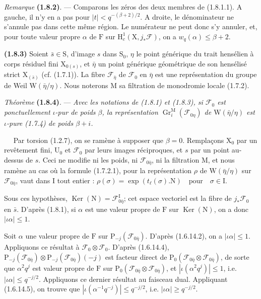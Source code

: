 \documentclass[11pt,leqno]{article}
\newcommand{\Page}[1]{\ifvmode\noindent\else\unskip\ \fi{\footnotesize\textcolor{gray}{[p.\,#1]}}\ \ignorespaces}
\begin{document}
\textit{Remarque} \textbf{(1.8.2)}. — Comparons les zéros des deux membres de (1.8.1.1). A gauche, il n’y en a pas pour \(|t|<q^{-(\beta+2)/2}\). A droite, le dénominateur ne s’annule pas dans cette même région. Le numérateur ne peut donc s’y annuler, et, pour toute valeur propre \(\alpha\) de \(\mathrm{F}\) sur \(\mathrm{H}_c^1(\mathrm{X},j_*\mathscr{F})\), on a \(w_q(\alpha)\leq\beta+2\).

\textbf{(1.8.3)} Soient \(\bar{s}\in\mathrm{S}\), d’image \(s\) dans \(\mathrm{S}_0\), \(\eta\) le point générique du trait hensélien à corps résiduel fini \(\mathrm{X}_{0(s)}\), et \(\bar{\eta}\) un point générique géométrique de son hensélisé strict \(\mathrm{X}_{(\bar{s})}\) (cf. (1.7.1)). La fibre \(\mathscr{F}_{\bar{\eta}}\) de \(\mathscr{F}_0\) en \(\bar{\eta}\) est une représentation du groupe de Weil \(\mathrm{W}(\bar{\eta}/\eta)\). Nous noterons \(\mathrm{M}\) sa filtration de monodromie locale (1.7.2).

\textit{Théorème} \textbf{(1.8.4)}. — \textit{Avec les notations de \textup{(1.8.1)} et \textup{(1.8.3)}, si \(\mathscr{F}_0\) est ponctuellement \(\iota\)-pur de poids \(\beta\), la représentation \(\operatorname{Gr}_i^{\mathrm{M}}(\mathscr{F}_{0\eta})\) de \(\mathrm{W}(\bar{\eta}/\eta)\) est \(\iota\)-pure \textup{(1.7.4)} de poids \(\beta+i\).}

\Page{176}
Par torsion (1.2.7), on se ramène à supposer que \(\beta=0\). Remplaçons \(\mathrm{X}_0\) par un revêtement fini, \(\mathrm{U}_0\) et \(\mathscr{F}_0\) par leurs images réciproques, et \(s\) par un point au-dessus de \(s\). Ceci ne modifie ni les poids, ni \(\mathscr{F}_{0\bar{\eta}}\), ni la filtration \(\mathrm{M}\), et nous ramène au cas où la formule (1.7.2.1), pour la représentation \(\rho\) de \(\mathrm{W}(\bar{\eta}/\eta)\) sur \(\mathscr{F}_{0\bar{\eta}}\), vaut dans \(\mathrm{I}\) tout entier :
\(\rho(\sigma)=\exp(t_\ell(\sigma).\mathrm{N})\quad\text{pour}\quad\sigma\in\mathrm{I}\).

Sous ces hypothèses, \(\operatorname{Ker}(\mathrm{N})=\mathscr{F}_{0\bar{\eta}}^{\mathrm{I}}\); cet espace vectoriel est la fibre de \(j_*\mathscr{F}_0\) en \(\bar{s}\). D’après (1.8.1), si \(\alpha\) est une valeur propre de \(\mathrm{F}\) sur \(\operatorname{Ker}(\mathrm{N})\), on a donc \(|\iota\alpha|\leq1\).

Soit \(\alpha\) une valeur propre de \(\mathrm{F}\) sur \(\mathrm{P}_{-j}(\mathscr{F}_{0\bar{\eta}})\). D’après (1.6.14.2), on a \(|\iota\alpha|\leq1\). Appliquons ce résultat à \(\mathscr{F}_0\otimes\mathscr{F}_0\). D’après (1.6.14.4), \(\mathrm{P}_{-j}(\mathscr{F}_{0\bar{\eta}})\otimes\mathrm{P}_{-j}(\mathscr{F}_{0\bar{\eta}})(-j)\) est facteur direct de \(\mathrm{P}_0(\mathscr{F}_{0\bar{\eta}}\otimes\mathscr{F}_{0\bar{\eta}})\), de sorte que \(\alpha^2q^j\) est valeur propre de \(\mathrm{F}\) sur \(\mathrm{P}_0(\mathscr{F}_{0\bar{\eta}}\otimes\mathscr{F}_{0\bar{\eta}})\), et \(|\iota(\alpha^2q^j)|\leq1\), i.e. \(|\iota\alpha|\leq q^{-j/2}\). Appliquons ce dernier résultat au faisceau dual. Appliquant (1.6.14.5), on trouve que \(|\iota(\alpha^{-1}q^{-j})|\leq q^{-j/2}\), i.e. \(|\iota\alpha|\geq q^{-j/2}\).
\end{document}
